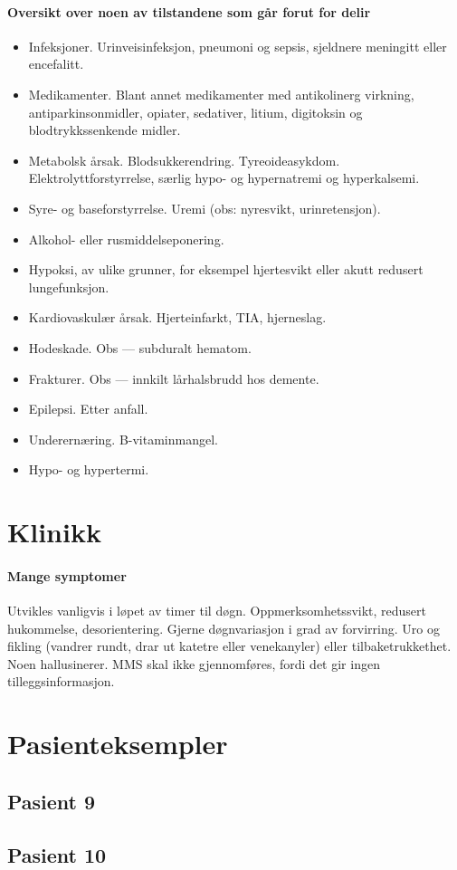 				\paragraph{Oversikt over noen av tilstandene som går forut for delir\\}
					\begin{itemize}	
						\item Infeksjoner. Urinveisinfeksjon, pneumoni og sepsis, sjeldnere meningitt eller encefalitt.\\
						\item Medikamenter. Blant annet medikamenter med antikolinerg virkning, antiparkinsonmidler, opiater, sedativer, litium, digitoksin og blodtrykkssenkende midler.\\
						\item Metabolsk årsak. Blodsukkerendring. Tyreoideasykdom. Elektrolyttforstyrrelse, særlig hypo- og hypernatremi og hyperkalsemi. \\
						\item Syre- og baseforstyrrelse. Uremi (obs: nyresvikt, urinretensjon).\\
						\item Alkohol- eller rusmiddelseponering.\\
						\item Hypoksi, av ulike grunner, for eksempel hjertesvikt eller akutt redusert lungefunksjon.\\
						\item Kardiovaskulær årsak. Hjerteinfarkt, TIA, hjerneslag.\\
						\item Hodeskade. Obs — subduralt hematom.\\
						\item Frakturer. Obs — innkilt lårhalsbrudd hos demente.\\
						\item Epilepsi. Etter anfall.\\
						\item Underernæring. B-vitaminmangel.\\
						\item Hypo- og hypertermi.\\
					\end{itemize}

		\section{Klinikk}
			\paragraph{Mange symptomer}
				Utvikles vanligvis i løpet av timer til døgn. Oppmerksomhetssvikt, redusert hukommelse, desorientering. Gjerne døgnvariasjon i grad av forvirring. Uro og fikling (vandrer rundt, drar ut katetre eller venekanyler) eller tilbaketrukkethet. Noen hallusinerer. MMS skal ikke gjennomføres, fordi det gir ingen tilleggsinformasjon.
		\section{Pasienteksempler}
			\subsection{Pasient 9}
			\subsection{Pasient 10}